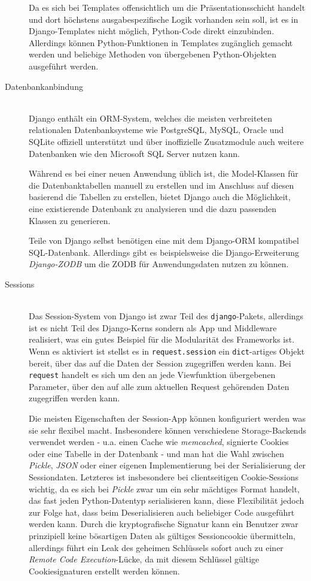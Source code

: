 \begin{description}
Da es sich bei Templates offensichtlich um die Präsentationsschicht handelt und dort höchstens
ausgabespezifische Logik vorhanden sein soll, ist es in Django-Templates nicht möglich, Python-Code
direkt einzubinden. Allerdings können Python-Funktionen in Templates zugänglich gemacht werden und
beliebige Methoden von übergebenen Python-Objekten ausgeführt werden.




\item[Datenbankanbindung] \hfill \\
Django enthält ein ORM-System, welches die meisten verbreiteten relationalen Datenbanksysteme wie
PostgreSQL, MySQL, Oracle und SQLite offiziell unterstützt und über inoffizielle Zusatzmodule auch
weitere Datenbanken wie den Microsoft SQL Server nutzen kann.

Während es bei einer neuen Anwendung üblich ist, die Model-Klassen für die Datenbanktabellen manuell
zu erstellen und im Anschluss auf diesen basierend die Tabellen zu erstellen, bietet Django auch die
Möglichkeit, eine existierende Datenbank zu analysieren und die dazu passenden Klassen zu
generieren.

Teile von Django selbst benötigen eine mit dem Django-ORM kompatibel SQL-Datenbank. Allerdings gibt
es beispielsweise die Django-Erweiterung \emph{Django-ZODB} um die ZODB für Anwendungsdaten nutzen
zu können.


\item[Sessions] \hfill \\
Das Session-System von Django ist zwar Teil des \lstinline{django}-Pakets, allerdings ist es nicht
Teil des Django-Kerns sondern als App und Middleware realisiert, was ein gutes Beispiel für die
Modularität des Frameworks ist. Wenn es aktiviert ist stellst es in \lstinline{request.session} ein
\lstinline{dict}-artiges Objekt bereit, über das auf die Daten der Session zugegriffen werden kann.
Bei \lstinline{request} handelt es sich um den an jede Viewfunktion übergebenen Parameter, über den
auf alle zum aktuellen Request gehörenden Daten zugegriffen werden kann.

Die meisten Eigenschaften der Session-App können konfiguriert werden was sie sehr flexibel macht.
Insbesondere können verschiedene Storage-Backends verwendet werden - u.a. einen Cache wie
\emph{memcached}, signierte Cookies oder eine Tabelle in der Datenbank - und man hat die Wahl
zwischen \emph{Pickle}, \emph{JSON} oder einer eigenen Implementierung bei der Serialisierung der
Sessiondaten. Letzteres ist insbesondere bei clientseitigen Cookie-Sessions wichtig, da es sich bei
\emph{Pickle} zwar um ein sehr mächtiges Format handelt, das fast jeden Python-Datentyp
serialisieren kann, diese Flexibilität jedoch zur Folge hat, dass beim Deserialisieren auch
beliebiger Code ausgeführt werden kann. Durch die kryptografische Signatur kann ein Benutzer zwar
prinzipiell keine bösartigen Daten als gültiges Sessioncookie übermitteln, allerdings führt ein Leak
des geheimen Schlüssels sofort auch zu einer \emph{Remote Code Execution}-Lücke, da mit diesem
Schlüssel gültige Cookiesignaturen erstellt werden können.


\end{description}
